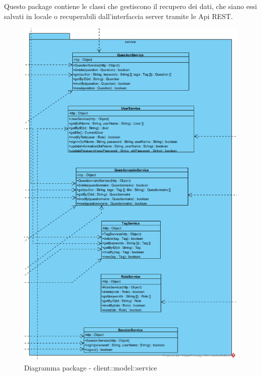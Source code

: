 Questo package contiene le classi che gestiscono il recupero dei dati, che siano essi salvati in locale o recuperabili dall'interfaccia server tramite le Api REST.\begin{center}
		\begin{figure}[H]
			\centering \includegraphics[scale=4, max width=\textwidth, max height=\myheight]{../img/diagrammiClassi/client/model/service.png}
			\caption{Diagramma package - client::model::service}
		\end{figure}
	\end{center}\hypertarget{client::model::service::SessionService}{}
